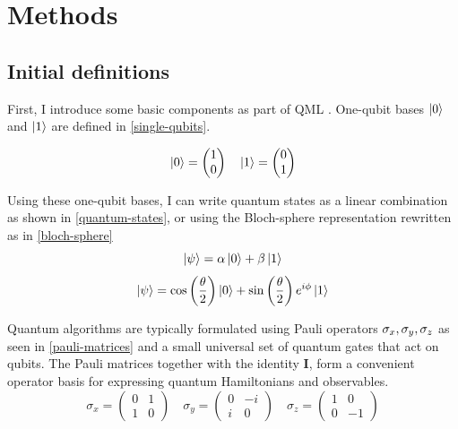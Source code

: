 \section{Methods}\label{section:methods}

\subsection{Initial definitions}

First, I introduce some basic components as part of QML \parencite{nielsen2000qci,rieffel2011gentle,olivares2025qc}. One-qubit bases $\left| 0 \right\rangle$ and $\left| 1 \right\rangle$ are defined in \cref{single-qubits}.

\begin{equation}\label{single-qubits}
    \left| 0 \right\rangle = \begin{pmatrix}
        1\\0
    \end{pmatrix}\quad
    \left| 1 \right\rangle = \begin{pmatrix}
        0\\1
    \end{pmatrix}
\end{equation}

Using these one-qubit bases, I can write quantum states as a linear combination as shown in \cref{quantum-states}, or using the Bloch-sphere representation rewritten as in \cref{bloch-sphere}
\begin{equation}\label{quantum-states}
    \left| \psi \right\rangle = \alpha\left| 0 \right\rangle+\beta\left| 1 \right\rangle
\end{equation}
\begin{equation}\label{bloch-sphere}
    \left| \psi \right\rangle=\cos\left(\frac{\theta}{2}\right)\left| 0 \right\rangle+\sin\left(\frac{\theta}{2}\right)e^{i\phi}\left| 1 \right\rangle
\end{equation}

Quantum algorithms are typically formulated using Pauli operators $\sigma_x,\space\sigma_y,\space\sigma_z$ as seen in \cref{pauli-matrices} and a small universal set of quantum gates that act on qubits. The Pauli matrices together with the identity $\textbf{I}$, form a convenient operator basis for expressing quantum Hamiltonians and observables. 
\begin{equation}\label{pauli-matrices}
    \sigma_x=\begin{pmatrix}
        0&1\\1&0
    \end{pmatrix}\quad
    \sigma_y=\begin{pmatrix}
        0&-i\\i&0
    \end{pmatrix}\quad
    \sigma_z=\begin{pmatrix}
        1&0\\0&-1
    \end{pmatrix}
\end{equation}

